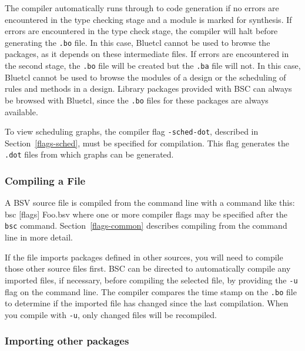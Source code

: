 \documentclass{article}
\newcommand{\te}[1]{\texttt{#1}}
\newenvironment{centerboxverbatim}
  {\center
   \boxedverbatim}
  {\endboxedverbatim
  {\endcenter }}
\begin{document}
The compiler  automatically runs through to code generation if no
errors are  encountered in the type checking stage and a module is
marked for synthesis.  If errors are encountered in the type check
stage,  the compiler will halt before generating the
\te{.bo} file.  In this case, Bluetcl cannot be used to browse
the packages, as it depends on these intermediate files.
If errors are encountered in the second stage, the
\te{.bo} file will be created but the \te{.ba} file will not.
In this case, Bluetcl cannot be used to browse the modules of a
design or the scheduling of rules and methods in a design.
Library packages provided with BSC can always be browsed with
Bluetcl, since the \te{.bo} files for these packages are
always available.

\index{-sched-dot@\te{-sched-dot} (compiler flag)}
To view scheduling graphs, the compiler flag \te{-sched-dot},
described in Section~\ref{flags-sched}, must be specified for
compilation.  This flag generates the \te{.dot} files
from which graphs can be generated.


\subsubsection{Compiling a File}

A BSV source file is compiled from the command line with a command like this:
\begin{centerboxverbatim}
bsc [flags] Foo.bsv
\end{centerboxverbatim}
where one or more compiler flags may be specified after the \te{bsc} command.
Section~\ref{flags-common} describes compiling from the command line
in more detail.

If the file imports packages defined in other sources, you will need to
compile those other source files first.  BSC can be directed to
automatically compile any imported files, if necessary, before compiling
the selected file, by providing the \te{-u} flag on the command line.
The compiler compares the time stamp on the \te{.bo} file
to determine if the imported file has changed since the last
compilation.  When you compile with \te{-u}, only changed files
will be recompiled.


\subsubsection{Importing other packages}
\label{sec-import-packages}
\end{document}
